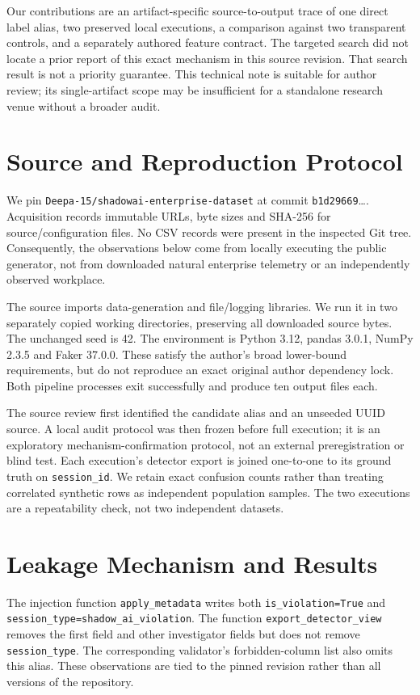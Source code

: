 \documentclass[sigconf,nonacm]{acmart}
\begin{document}
Our contributions are an artifact-specific source-to-output trace of one direct label alias, two preserved local executions, a comparison against two transparent controls, and a separately authored feature contract. The targeted search did not locate a prior report of this exact mechanism in this source revision. That search result is not a priority guarantee. This technical note is suitable for author review; its single-artifact scope may be insufficient for a standalone research venue without a broader audit.

\section{Source and Reproduction Protocol}
We pin \texttt{Deepa-15/shadowai-enterprise-dataset} at commit \texttt{b1d29669}\ldots. Acquisition records immutable URLs, byte sizes and SHA-256 for source/configuration files. No CSV records were present in the inspected Git tree. Consequently, the observations below come from locally executing the public generator, not from downloaded natural enterprise telemetry or an independently observed workplace.

The source imports data-generation and file/logging libraries. We run it in two separately copied working directories, preserving all downloaded source bytes. The unchanged seed is 42. The environment is Python 3.12, pandas 3.0.1, NumPy 2.3.5 and Faker 37.0.0. These satisfy the author's broad lower-bound requirements, but do not reproduce an exact original author dependency lock. Both pipeline processes exit successfully and produce ten output files each.

The source review first identified the candidate alias and an unseeded UUID source. A local audit protocol was then frozen before full execution; it is an exploratory mechanism-confirmation protocol, not an external preregistration or blind test. Each execution's detector export is joined one-to-one to its ground truth on \texttt{session\_id}. We retain exact confusion counts rather than treating correlated synthetic rows as independent population samples. The two executions are a repeatability check, not two independent datasets.

\section{Leakage Mechanism and Results}
The injection function \texttt{apply\_metadata} writes both \texttt{is\_violation=True} and \texttt{session\_type=shadow\_ai\_violation}. The function \texttt{export\_detector\_view} removes the first field and other investigator fields but does not remove \texttt{session\_type}. The corresponding validator's forbidden-column list also omits this alias. These observations are tied to the pinned revision rather than all versions of the repository.
\end{document}
